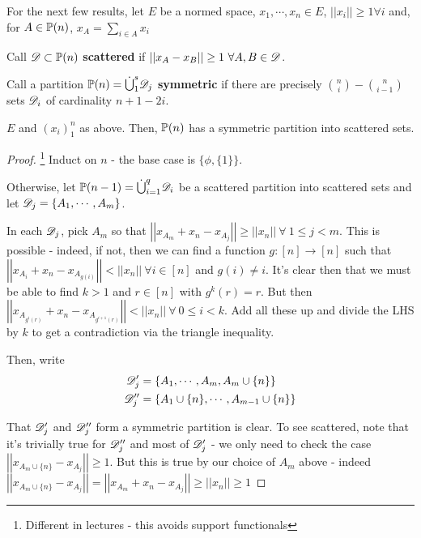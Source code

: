 \documentclass[a4paper]{article}
\begin{document}
For the next few results, let $E$ be a normed space, $x_1,\cdots, x_n\in E$, $\left|\left|x_i\right|\right|\geq 1\forall i$ and, for $A\in\P(n)$, $x_A=\sum_{i\in A}x_i$

\begin{defi}[Scattered]
	Call $\calD\subset\P(n)$ \textbf{scattered} if $\left|\left|x_A - x_B\right|\right|\geq1\ \forall A, B\in \calD$.
\end{defi}

\begin{defi}
	Call a partition $\P(n)=\dot{\bigcup}_1^s\calD_j$ \textbf{symmetric} if there are precisely $\binom{n}{i}-\binom{n}{i-1}$ sets $\calD_i$ of cardinality $n+1-2i$.
\end{defi}

\begin{thm}[7, Kleitman, 1970]
	$E$ and $(x_i)_1^n$ as above. Then, $\P(n)$ has a symmetric partition into scattered sets.
\end{thm}
\begin{proof}\footnote{Different in lectures - this avoids support functionals}
	Induct on $n$ - the base case is $\{\phi,\{1\}\}$.
	
	Otherwise, let $\P(n-1)=\dot{\bigcup}_{i=1}^{q}\calD_i$ be a scattered partition into scattered sets and let $\calD_j=\{A_1,\cdots,A_m\}$.
	
	In each $\calD_j$, pick $A_m$ so that $\left|\left|x_{A_m} + x_n - x_{A_j}\right|\right|\geq \left|\left|x_n\right|\right|\ \forall\ 1\leq j<m$. This is possible - indeed, if not, then we can find a function $g:[n]\rightarrow[n]$ such that $\left|\left|x_{A_i} + x_n - x_{A_{g(i)}}\right|\right|< \left|\left|x_n\right|\right|\ \forall i\in[n]$ and $g(i)\neq i$. It's clear then that we must be able to find $k>1$ and $r\in[n]$ with $g^k(r)=r$. But then $\left|\left|x_{A_{g^i(r)}} + x_n - x_{A_{g^{i+1}(r)}}\right|\right|< \left|\left|x_n\right|\right|\ \forall\ 0\leq i<k$. Add all these up and divide the LHS by $k$ to get a contradiction via the triangle inequality.
	
	Then, write
	\begin{align*}
	\calD_j'&=\{A_1,\cdots,A_m,A_m\cup\{n\}\}\\
	\calD_j''&=\{A_1\cup\{n\},\cdots,A_{m-1}\cup\{n\}\}
	\end{align*}
	
	That $\calD_j'$ and $\calD_j''$ form a symmetric partition is clear. To see scattered, note that it's trivially true for $\calD_j''$ and most of $\calD_j'$ - we only need to check the case $\left|\left|x_{A_m\cup\{n\}}-x_{A_j}\right|\right|\geq 1$. But this is true by our choice of $A_m$ above - indeed $\left|\left|x_{A_m\cup\{n\}} - x_{A_j}\right|\right|=\left|\left|x_{A_m} + x_n - x_{A_j}\right|\right|\geq \left|\left|x_n\right|\right|\geq1$
\end{proof}
\end{document}
